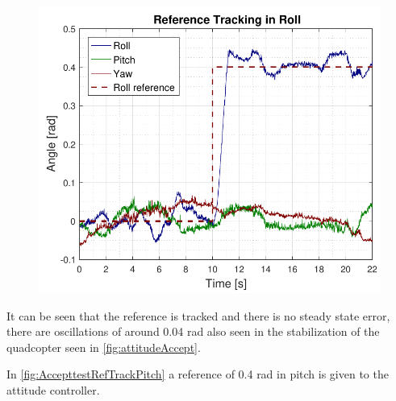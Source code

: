 \begin{figure}[H]
	\includegraphics[scale=.7]{figures/AccepttestRefTrackRoll.pdf}
	\centering			
	\label{fig:AccepttestRefTrackRoll}
\end{figure}

It can be seen that the reference is tracked and there is no steady state error, there are oscillations of around 0.04 rad also seen in the stabilization of the quadcopter seen in \autoref{fig:attitudeAccept}.

In \autoref{fig:AccepttestRefTrackPitch} a reference of 0.4 rad in pitch is given to the attitude controller.

